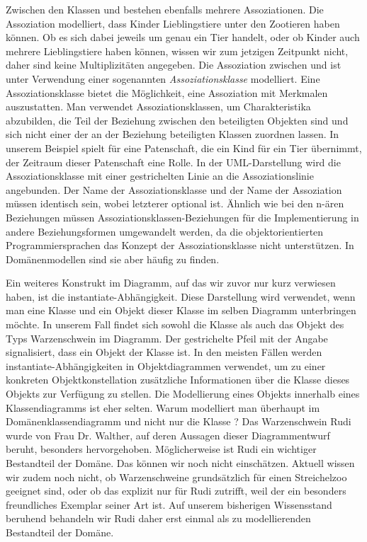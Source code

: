 Zwischen den Klassen  und  bestehen ebenfalls mehrere Assoziationen. Die Assoziation  modelliert, dass Kinder Lieblingstiere unter den Zootieren haben können. Ob es sich dabei jeweils um genau ein Tier handelt, oder ob Kinder auch mehrere Lieblingstiere haben können, wissen wir zum jetzigen Zeitpunkt nicht, daher sind keine Multiplizitäten angegeben. Die Assoziation  zwischen  und  ist unter Verwendung einer sogenannten \textit{Assoziationsklasse}
modelliert. Eine Assoziationsklasse bietet die Möglichkeit, eine Assoziation mit Merkmalen auszustatten. Man verwendet Assoziationsklassen, um Charakteristika abzubilden, die Teil der Beziehung zwischen den beteiligten Objekten sind und sich nicht einer der an der Beziehung beteiligten Klassen zuordnen lassen. In unserem Beispiel spielt für eine Patenschaft, die ein Kind für ein Tier übernimmt, der Zeitraum dieser Patenschaft eine Rolle. In der UML-Darstellung wird die Assoziationsklasse mit einer gestrichelten Linie an die Assoziationslinie angebunden. Der Name der Assoziationsklasse und der Name der Assoziation müssen identisch sein, wobei letzterer optional ist. Ähnlich wie bei den n-ären Beziehungen müssen Assoziationsklassen-Beziehungen für die Implementierung in andere Beziehungsformen umgewandelt werden, da die objektorientierten Programmiersprachen das Konzept der Assoziationsklasse nicht unterstützen. In Domänenmodellen sind sie aber häufig zu finden.

Ein  weiteres Konstrukt im Diagramm, auf das wir zuvor nur kurz verwiesen haben, ist die instantiate-Abhängigkeit.
Diese Darstellung wird verwendet, wenn man eine Klasse und ein Objekt dieser Klasse im selben Diagramm unterbringen möchte. In unserem Fall findet sich sowohl die Klasse  als auch das Objekt  des Typs Warzenschwein im Diagramm. Der gestrichelte Pfeil mit der Angabe  signalisiert, dass  ein Objekt der Klasse  ist. In den meisten Fällen werden instantiate-Abhängigkeiten in Objektdiagrammen verwendet, um zu einer konkreten Objektkonstellation zusätzliche Informationen über die Klasse dieses Objekts zur Verfügung zu stellen. Die Modellierung eines Objekts innerhalb eines Klassendiagramms ist eher selten. Warum modelliert man  überhaupt im Domänenklassendiagramm und nicht nur die Klasse ? Das Warzenschwein Rudi wurde von Frau Dr. Walther, auf deren Aussagen dieser Diagrammentwurf beruht, besonders hervorgehoben. Möglicherweise ist Rudi ein wichtiger Bestandteil der Domäne. Das können wir noch nicht einschätzen. Aktuell wissen wir zudem noch nicht, ob Warzenschweine grundsätzlich für einen Streichelzoo geeignet sind, oder ob das explizit nur für Rudi zutrifft, weil der ein besonders freundliches Exemplar seiner Art ist. Auf unserem bisherigen Wissensstand beruhend behandeln wir Rudi daher erst einmal als zu modellierenden Bestandteil der Domäne.

